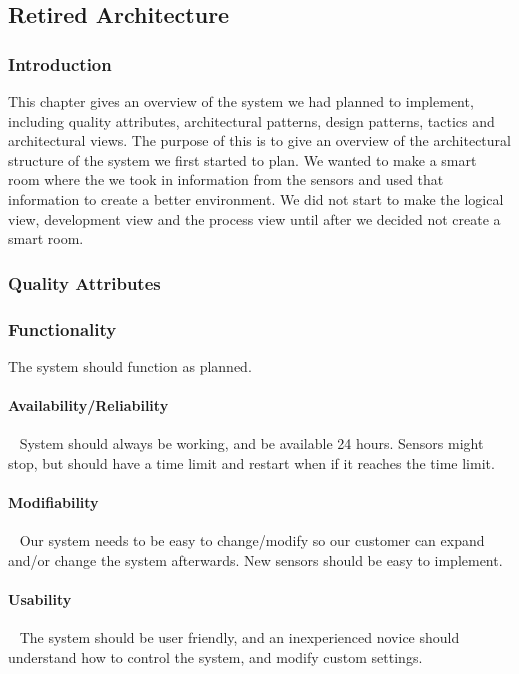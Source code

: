 \documentclass[../document]{subfiles}
\begin{document}
\subsection{Retired Architecture}
\label{retired_architecture}
\subsubsection{Introduction}
This chapter gives an overview of the system we had planned to implement, including quality attributes, architectural patterns, design patterns, tactics and architectural views. The purpose of this is to give an overview of the architectural structure of the system we first started to plan. We wanted to make a smart room where the we took in information from the sensors and used that information to create a better environment. We did not start to make the logical view, development view and the process view until after we decided not create a smart room.

\subsubsection{Quality Attributes}
\subsubsection{Functionality}
The system should function as planned. 

\paragraph{Availability/Reliability} \ \newline
System should always be working, and be available 24 hours. Sensors might stop, but should have a time limit and restart when if it reaches the time limit. 

\paragraph{Modifiability} \ \newline
Our system needs to be easy to change/modify so our customer can expand and/or change the system afterwards. New sensors should be easy to implement.

\paragraph{Usability} \ \newline
The system should be user friendly, and an inexperienced novice should understand how to control the system, and modify custom settings.
\end{document}
